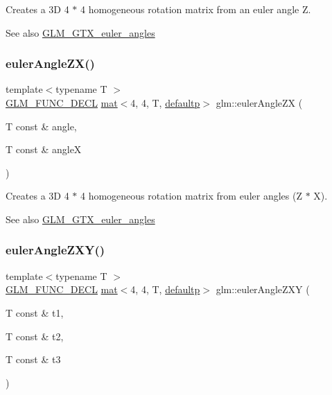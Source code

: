Creates a 3D 4 $\ast$ 4 homogeneous rotation matrix from an euler angle Z. \begin{DoxySeeAlso}{See also}
\mbox{\hyperlink{group__gtx__euler__angles}{G\+L\+M\+\_\+\+G\+T\+X\+\_\+euler\+\_\+angles}} 
\end{DoxySeeAlso}
\mbox{\label{group__gtx__euler__angles_ga483903115cd4059228961046a28d69b5}} 
\subsubsection{\texorpdfstring{euler\+Angle\+Z\+X()}{eulerAngleZX()}}
{\footnotesize\ttfamily template$<$typename T $>$ \\
\mbox{\hyperlink{setup_8hpp_ab2d052de21a70539923e9bcbf6e83a51}{G\+L\+M\+\_\+\+F\+U\+N\+C\+\_\+\+D\+E\+CL}} \mbox{\hyperlink{structglm_1_1mat}{mat}}$<$4, 4, T, \mbox{\hyperlink{namespaceglm_a36ed105b07c7746804d7fdc7cc90ff25a9d21ccd8b5a009ec7eb7677befc3bf51}{defaultp}}$>$ glm\+::euler\+Angle\+ZX (\begin{DoxyParamCaption}\item[{T const \&}]{angle,  }\item[{T const \&}]{angleX }\end{DoxyParamCaption})}

Creates a 3D 4 $\ast$ 4 homogeneous rotation matrix from euler angles (Z $\ast$ X). \begin{DoxySeeAlso}{See also}
\mbox{\hyperlink{group__gtx__euler__angles}{G\+L\+M\+\_\+\+G\+T\+X\+\_\+euler\+\_\+angles}} 
\end{DoxySeeAlso}
\mbox{\label{group__gtx__euler__angles_gab4505c54d2dd654df4569fd1f04c43aa}} 
\subsubsection{\texorpdfstring{euler\+Angle\+Z\+X\+Y()}{eulerAngleZXY()}}
{\footnotesize\ttfamily template$<$typename T $>$ \\
\mbox{\hyperlink{setup_8hpp_ab2d052de21a70539923e9bcbf6e83a51}{G\+L\+M\+\_\+\+F\+U\+N\+C\+\_\+\+D\+E\+CL}} \mbox{\hyperlink{structglm_1_1mat}{mat}}$<$4, 4, T, \mbox{\hyperlink{namespaceglm_a36ed105b07c7746804d7fdc7cc90ff25a9d21ccd8b5a009ec7eb7677befc3bf51}{defaultp}}$>$ glm\+::euler\+Angle\+Z\+XY (\begin{DoxyParamCaption}\item[{T const \&}]{t1,  }\item[{T const \&}]{t2,  }\item[{T const \&}]{t3 }\end{DoxyParamCaption})}

